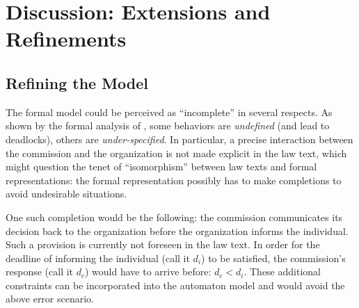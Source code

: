 

\section{Discussion: Extensions and Refinements}\label{sec:discussion}


\subsection{Refining the Model}\label{sec:refining_model}

The formal model could be perceived as ``incomplete'' in several respects. As
shown by the formal analysis of , some behaviors
are \emph{undefined} (and lead to deadlocks), others are
\emph{under-specified}. In particular, a precise interaction between the
commission and the organization is not made explicit in the law text, which
might question the tenet of ``isomorphism''
\cite{bench_capon_gordon_isomorphism_2009} between law texts and formal
representations: the formal representation possibly has to make completions to
avoid undesirable situations.

One such completion would be the following: the commission communicates its
decision back to the organization before the organization informs the
individual. Such a provision is currently not foreseen in the law text. In
order for the deadline of informing the individual (call it $d_i$) to be
satisfied, the commission's response (call it $d_c$) would have to arrive
before: $d_c < d_i$. These additional constraints can be incorporated into the
automaton model and would avoid the above error scenario.


